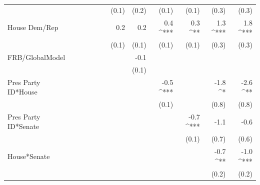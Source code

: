 \documentclass[a4paper]{article}\usepackage{graphicx, color}
\begin{document}
\begin{table}[ht]
\begin{center}
{\begin{tabular}{ l D{.}{.}{1}D{.}{.}{1}D{.}{.}{1}D{.}{.}{1}D{.}{.}{1}D{.}{.}{1}D{.}{.}{1}D{.}{.}{1}D{.}{.}{1}D{.}{.}{1}D{.}{.}{1} }
                     &                &                &                &                &                & (0.1)          & (0.2)          & (0.1)          & (0.1)          & (0.3)          & (0.3)         \\ 
House Dem/Rep        &                &                &                &                &                & 0.2            & 0.2            & 0.4 ^{***}     & 0.3 ^{**}      & 1.3 ^{***}     & 1.8 ^{***}    \\ 
                     &                &                &                &                &                & (0.1)          & (0.1)          & (0.1)          & (0.1)          & (0.3)          & (0.3)         \\ 
FRB/GlobalModel      &                &                &                &                &                &                & -0.1           &                &                &                &               \\ 
                     &                &                &                &                &                &                & (0.1)          &                &                &                &               \\ 
Pres Party ID*House  &                &                &                &                &                &                &                & -0.5 ^{***}    &                & -1.8 ^*        & -2.6 ^{**}    \\ 
                     &                &                &                &                &                &                &                & (0.1)          &                & (0.8)          & (0.8)         \\ 
Pres Party ID*Senate &                &                &                &                &                &                &                &                & -0.7 ^{***}    & -1.1           & -0.6          \\ 
                     &                &                &                &                &                &                &                &                & (0.1)          & (0.7)          & (0.6)         \\ 
House*Senate         &                &                &                &                &                &                &                &                &                & -0.7 ^{**}     & -1.0 ^{***}   \\ 
                     &                &                &                &                &                &                &                &                &                & (0.2)          & (0.2)         \\ 

\end{tabular}}
\end{center}
\end{table}
\end{document}
